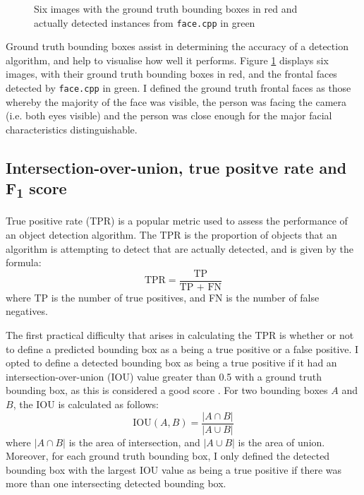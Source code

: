 \documentclass[twocolumn, 10pt, a4paper]{article}
\begin{document}
\begin{figure}[htbp]
  \hfill
  \hfill
  \caption{Six images with the ground truth bounding boxes in red and actually detected instances from \texttt{face.cpp} in green}\label{fig:face}
\end{figure}

Ground truth bounding boxes assist in determining the accuracy of a detection algorithm, and help to visualise how well it performs.
Figure \ref{fig:face} displays six images, with their ground truth bounding boxes in red, and the frontal faces detected by \texttt{face.cpp} in green.
I defined the ground truth frontal faces as those whereby the majority of the face was visible, the person was facing the camera (i.e. both eyes visible) and the person was close enough for the major facial characteristics distinguishable.

\subsection{Intersection-over-union, true positve rate and F\textsubscript{1} score}

True positive rate (TPR) is a popular metric used to assess the performance of an object detection algorithm.
The TPR is the proportion of objects that an algorithm is attempting to detect that are actually detected, and is given by the formula:
\[
  \textrm{TPR} = \frac{\textrm{TP}}{\textrm{TP + FN}}
\]
where TP is the number of true positives, and FN is the number of false negatives.

The first practical difficulty that arises in calculating the TPR is whether or not to define a predicted bounding box as a being a true positive or a false positive.
I opted to define a detected bounding box as being a true positive if it had an intersection-over-union (IOU) value greater than 0.5 with a ground truth bounding box, as this is considered a good score \cite{iou}.
For two bounding boxes $A$ and $B$, the IOU is calculated as follows:
\[
  \textrm{IOU}(A, B) = \frac{|A \cap B|}{|A \cup B|}
\]
where $|A \cap B|$ is the area of intersection, and $|A \cup B|$ is the area of union.
Moreover, for each ground truth bounding box, I only defined the detected bounding box with the largest IOU value as being a true positive if there was more than one intersecting detected bounding box.
\end{document}
